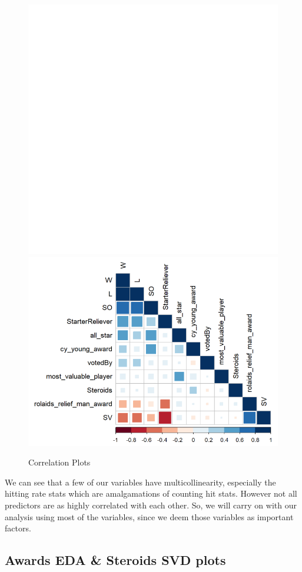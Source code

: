\documentclass[
]{article}
\begin{document}
\begin{figure}

{\centering \includegraphics[width=0.49\linewidth,height=0.2\textheight]{../corr_pos} \includegraphics[width=0.49\linewidth,height=0.2\textheight]{../Plots/corr_pitch} 

}

\caption{Correlation Plots}\label{fig:unnamed-chunk-1}
\end{figure}

We can see that a few of our variables have multicollinearity,
especially the hitting rate stats which are amalgamations of counting
hit stats. However not all predictors are as highly correlated with each
other. So, we will carry on with our analysis using most of the
variables, since we deem those variables as important factors.

\hypertarget{awards-eda-steroids-svd-plots}{%
\subsection{Awards EDA \& Steroids SVD
plots}\label{awards-eda-steroids-svd-plots}}
\end{document}
